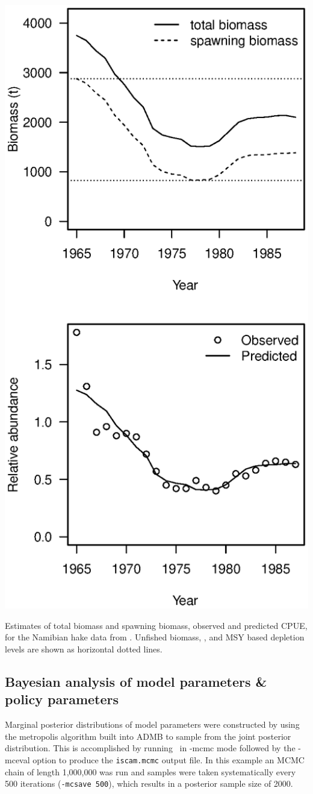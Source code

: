 \begin{multicols}{2}
\begin{figurehere}
	\centering
	\includegraphics[width=0.9\columnwidth]{iscamFigs/NhakeFigs.eps}
	\caption{Estimates of total biomass and spawning biomass, observed and predicted CPUE, for the Namibian hake data from \iscam. Unfished biomass, \bmsy, and MSY based depletion levels are shown as horizontal dotted lines.}\label{fig4}
\end{figurehere}

\subsection{Bayesian analysis of model parameters \& policy parameters}
Marginal posterior distributions of model parameters were constructed by using the metropolis algorithm built into ADMB to sample from the joint posterior distribution.  This is accomplished by running \iscam\ in -mcmc mode followed by the -mceval option to produce the \verb"iscam.mcmc" output file.  In this example an MCMC chain of length 1,000,000 was run and samples were taken systematically every 500 iterations (\verb"-mcsave 500"), which results in a posterior sample size of 2000.


\end{multicols}
